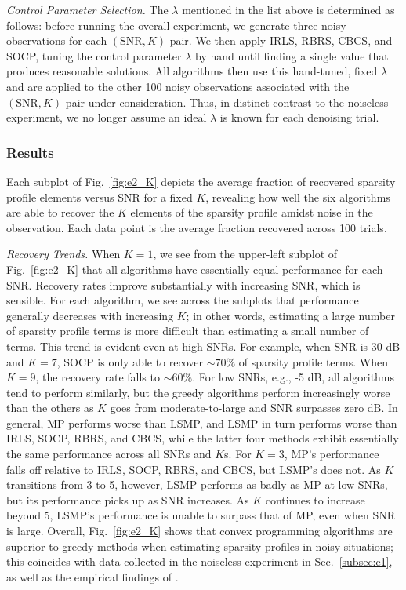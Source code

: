 \documentclass[final]{siamltex}
\begin{document}
   {\em{Control Parameter Selection}.} The $\lambda$ mentioned in the
   list above is determined as follows: before running the overall
   experiment, we generate three noisy observations for each
   $(\mbox{SNR}, K)$ pair.  We then apply IRLS, RBRS, CBCS, and SOCP,
   tuning the control parameter $\lambda$ by hand until finding a
   single value that produces reasonable solutions.  All algorithms
   then use this hand-tuned, fixed $\lambda$ and are applied to the
   other 100 noisy observations associated with the $(\mbox{SNR},K)$
   pair under consideration.  Thus, in distinct contrast to the
   noiseless experiment, we no longer assume an ideal $\lambda$ is
   known for each denoising trial.

   \subsubsection{Results}\label{subsubsec:e2_res} Each subplot of
   Fig.~\ref{fig:e2_K} depicts the average fraction of recovered
   sparsity profile elements versus SNR for a fixed $K$, revealing how
   well the six algorithms are able to recover the $K$ elements of the
   sparsity profile amidst noise in the observation.  Each data point
   is the average fraction recovered across 100 trials.

   {\em{Recovery Trends}.} When $K=1$, we see from the upper-left
   subplot of Fig.~\ref{fig:e2_K} that all algorithms have essentially
   equal performance for each SNR\@.  Recovery rates improve
   substantially with increasing SNR, which is sensible.  For each
   algorithm, we see across the subplots that performance generally
   decreases with increasing $K$; in other words, estimating a large
   number of sparsity profile terms is more difficult than estimating
   a small number of terms.  This trend is evident even at high SNRs.
   For example, when SNR is 30 dB and $K=7$, SOCP is only able to
   recover $\sim 70\%$ of sparsity profile terms.  When $K=9$, the
   recovery rate falls to $\sim 60\%$.  For low SNRs, e.g., -5 dB, all
   algorithms tend to perform similarly, but the greedy algorithms
   perform increasingly worse than the others as $K$ goes from
   moderate-to-large and SNR surpasses zero dB\@.  In general, MP
   performs worse than LSMP, and LSMP in turn performs worse than
   IRLS, SOCP, RBRS, and CBCS, while the latter four methods exhibit
   essentially the same performance across all SNRs and $K$s.  For
   $K=3$, MP's performance falls off relative to IRLS, SOCP, RBRS,
   and CBCS, but LSMP's does not.  As $K$ transitions from 3 to 5,
   however, LSMP performs as badly as MP at low SNRs, but its
   performance picks up as SNR increases.  As $K$ continues to
   increase beyond 5, LSMP's performance is unable to surpass that of
   MP, even when SNR is large.  Overall, Fig.~\ref{fig:e2_K} shows
   that convex programming algorithms are superior to greedy methods
   when estimating sparsity profiles in noisy situations; this
   coincides with data collected in the noiseless experiment in
   Sec.~\ref{subsec:e1}, as well as the empirical findings of
   \cite{Cot1999, Cot2005}.
\end{document}

